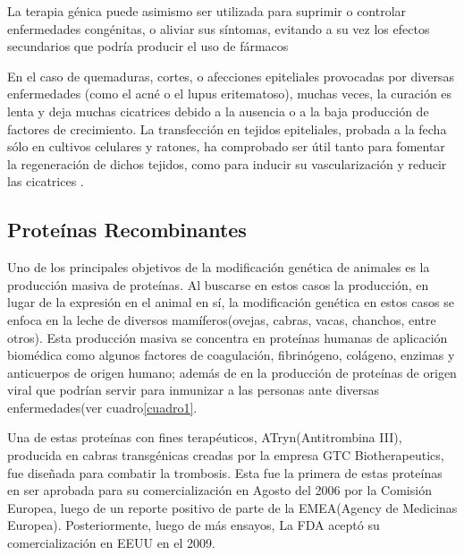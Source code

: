 \documentclass[fleqn,10pt]{SelfArx} %
\begin{document}
La terapia génica puede asimismo ser utilizada para suprimir o controlar enfermedades congénitas, o aliviar sus síntomas, evitando a su vez los efectos secundarios que podría producir el uso de fármacos \cite{Spink}

En el caso de quemaduras, cortes, o afecciones epiteliales provocadas por diversas enfermedades (como el acné o el lupus eritematoso), muchas veces, la curación es lenta y deja muchas cicatrices debido a la ausencia o a la baja producción de factores de crecimiento. La transfección en tejidos epiteliales, probada a la fecha sólo en cultivos celulares y ratones, ha comprobado ser útil tanto para fomentar la regeneración de dichos tejidos, como para inducir su vascularización y reducir las cicatrices \cite{branskigene2006, Reinhart, strulovicihuman2007}.

\subsection{Proteínas Recombinantes}

Uno de los principales objetivos de la modificación genética de animales es la producción masiva de proteínas. Al buscarse en estos casos la producción, en lugar de la expresión en el animal en sí, la modificación genética en estos casos se enfoca en la leche de diversos mamíferos(ovejas, cabras, vacas, chanchos, entre otros).  Esta producción masiva se concentra en proteínas humanas de aplicación biomédica como algunos factores de coagulación, fibrinógeno, colágeno, enzimas y anticuerpos de origen humano; además de en la producción de proteínas de origen viral que podrían servir para inmunizar a las personas ante diversas enfermedades(ver cuadro\ref{cuadro1}\cite{Durocher15012002, Koszarycz2004, schmidt2006belated, niemann2007transgenic, houdebine2009production, kling2009first}. 

Una de estas proteínas con fines terapéuticos, ATryn(Antitrombina III), producida en cabras transgénicas creadas por la empresa GTC Biotherapeutics, fue diseñada para combatir la trombosis. Esta fue la primera de estas proteínas en ser aprobada para su comercialización en Agosto del 2006 por la Comisión Europea, luego de un reporte positivo de parte de la EMEA(Agency de Medicinas Europea)\cite{schmidt2006belated}. Posteriormente, luego de más ensayos, La FDA aceptó su comercialización en EEUU en el 2009\cite{Fox, kling2009first}.
\end{document}
